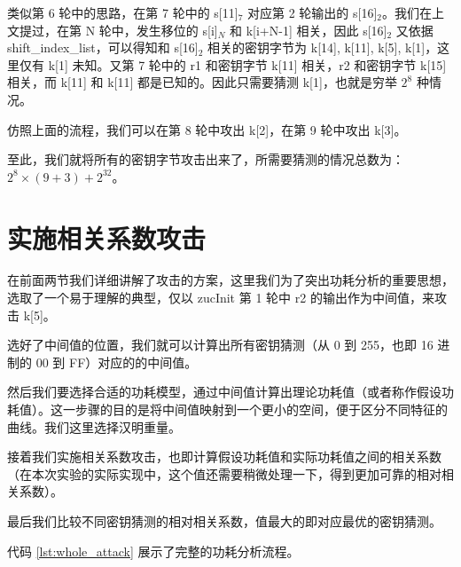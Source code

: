 类似第 6 轮中的思路，在第 7 轮中的 {\cnsls s[11]$_7$} 对应第 2 轮输出的 {\cnsls s[16]$_2$}。我们在上文提过，在第 N 轮中，发生移位的 {\cnsls s[i]$_N$} 和 {\cnsls k[i+N-1]} 相关，因此 {\cnsls s[16]$_2$} 又依据 {\cnsls shift\_index\_list}，可以得知和 {\cnsls s[16]$_2$} 相关的密钥字节为 {\cnsls k[14], k[11], k[5], k[1]}，这里仅有 {\cnsls k[1]} 未知。又第 7 轮中的 {\cnsls r1} 和密钥字节 {\cnsls k[11]} 相关，{\cnsls r2} 和密钥字节 {\cnsls k[15]} 相关，而 {\cnsls k[11]} 和 {\cnsls k[11]} 都是已知的。因此只需要猜测 {\cnsls k[1]}，也就是穷举 $2^8$ 种情况。

仿照上面的流程，我们可以在第 8 轮中攻出 {\cnsls k[2]}，在第 9 轮中攻出 {\cnsls k[3]}。

\vspace*{0.5\baselineskip}

至此，我们就将所有的密钥字节攻击出来了，所需要猜测的情况总数为：$2^8 \times (9+3) + 2^{32}$。

\section{实施相关系数攻击}

在前面两节我们详细讲解了攻击的方案，这里我们为了突出功耗分析的重要思想，选取了一个易于理解的典型，仅以 {\cnsls zucInit} 第 1 轮中 {\cnsls r2} 的输出作为中间值，来攻击 {\cnsls k[5]}。

选好了中间值的位置，我们就可以计算出所有密钥猜测（从 0 到 255，也即 16 进制的 00 到 FF）对应的的中间值。

然后我们要选择合适的功耗模型，通过中间值计算出理论功耗值（或者称作假设功耗值）。这一步骤的目的是将中间值映射到一个更小的空间，便于区分不同特征的曲线。我们这里选择汉明重量。

接着我们实施相关系数攻击，也即计算假设功耗值和实际功耗值之间的相关系数（在本次实验的实际实现中，这个值还需要稍微处理一下，得到更加可靠的相对相关系数）。

最后我们比较不同密钥猜测的相对相关系数，值最大的即对应最优的密钥猜测。

\vspace*{0.5\baselineskip}

代码 \ref{lst:whole_attack} 展示了完整的功耗分析流程。

